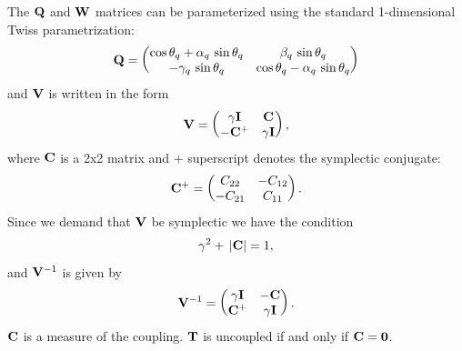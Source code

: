 The ${\bf Q}$ and ${\bf W}$ matrices can be parameterized using the standard 1-dimensional Twiss
parametrization:
\begin{equation}
  {\bf Q} = \begin{pmatrix}
    \cos\theta_q + \alpha_q \, \sin\theta_q & \beta_q \, \sin\theta_q \\
    -\gamma_q \, \sin\theta_q & \cos\theta_q - \alpha_q \, \sin\theta_q
    \end{pmatrix}
\end{equation}
and ${\bf V}$ is written in the form
  \begin{equation}
    {\bf V} = 
    \begin{pmatrix}
        \gamma {\bf I} & {\bf C} \cr 
        -{\bf C}^+     & \gamma {\bf I} \cr
    \end{pmatrix}
    , \label{vgicc1}
  \end{equation}
where ${\bf C}$ is a 2x2 matrix and $+$ superscript 
denotes the symplectic conjugate:
  \begin{equation}
    {\bf C}^+ = 
    \begin{pmatrix}
       C_{22} & -C_{12} \cr 
      -C_{21} & C_{11} \cr
    \end{pmatrix}
    . \label{ccccc}
  \end{equation}
Since we demand that ${\bf V}$ be symplectic we have the condition
  \begin{equation}               
    \gamma^2 + \, |{\bf C}| = 1
    , \label{gc1}
  \end{equation}
and ${\bf V}^{-1}$ is given by
  \begin{equation}
    {\bf V}^{-1} = 
    \begin{pmatrix}
      \gamma {\bf I} & -{\bf C} \cr 
      {\bf C}^+ & \gamma {\bf I} \cr
    \end{pmatrix}
    . \label{vgicc2}
  \end{equation} 
${\bf C}$ is a measure of the coupling. ${\bf T}$ is uncoupled if and only if ${\bf C} = {\bf 0}$.

